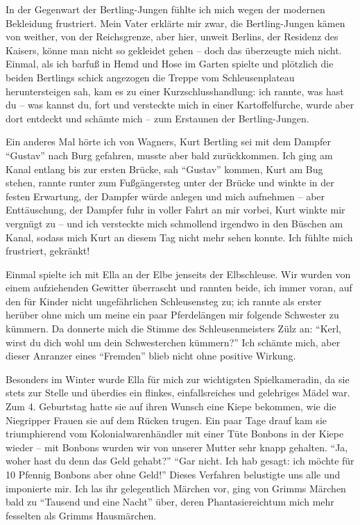 In der Gegenwart der Bertling-Jungen fühlte ich mich wegen der modernen Bekleidung frustriert. Mein Vater erklärte mir zwar, die Bertling-Jungen kämen von weither, von der Reichsgrenze, aber hier, unweit Berlins, der Residenz des Kaisers, könne man nicht so gekleidet gehen -- doch das überzeugte mich nicht. Einmal, als ich barfuß in Hemd und Hose im Garten spielte und plötzlich die beiden Bertlings schick angezogen die Treppe vom Schleusenplateau heruntersteigen sah, kam es zu einer Kurzschlusshandlung: ich rannte, was hast du -- was kannst du, fort und versteckte mich in einer Kartoffelfurche, wurde aber dort entdeckt und schämte mich -- zum Erstaunen der Bertling-Jungen.

Ein anderes Mal hörte ich von Wagners, Kurt Bertling sei mit dem Dampfer \enquote{Gustav} nach Burg gefahren, musste aber bald zurückkommen. Ich ging am Kanal entlang bis zur ersten Brücke, sah \enquote{Gustav} kommen, Kurt am Bug stehen, rannte runter zum Fußgängersteg unter der Brücke und winkte in der festen Erwartung, der Dampfer würde anlegen und mich aufnehmen -- aber Enttäuschung, der Dampfer fuhr in voller Fahrt an mir vorbei, Kurt winkte mir vergnügt zu -- und ich versteckte mich schmollend irgendwo in den Büschen am Kanal, sodass mich Kurt an diesem Tag nicht mehr sehen konnte. Ich fühlte mich frustriert, gekränkt!

Einmal spielte ich mit Ella an der Elbe jenseits der Elbschleuse. Wir wurden von einem aufziehenden Gewitter überrascht und rannten beide, ich immer voran, auf den für Kinder nicht ungefährlichen Schleusensteg zu; ich rannte als erster herüber ohne mich um meine ein paar Pferdelängen mir folgende Schwester zu kümmern. Da donnerte mich die Stimme des Schleusenmeisters Zülz an: \enquote{Kerl, wirst du dich wohl um dein Schwesterchen kümmern?} Ich schämte mich, aber dieser Anranzer eines \enquote{Fremden} blieb nicht ohne positive Wirkung.

Besonders im Winter wurde Ella für mich zur wichtigsten Spielkameradin, da sie stets zur Stelle und überdies ein flinkes, einfallsreiches und gelehriges Mädel war. Zum 4. Geburtstag hatte sie auf ihren Wunsch eine Kiepe bekommen, wie die Niegripper Frauen sie auf dem Rücken trugen. Ein paar Tage drauf kam sie triumphierend vom Kolonialwarenhändler mit einer Tüte Bonbons in der Kiepe wieder -- mit Bonbons wurden wir von unserer Mutter sehr knapp gehalten. \enquote{Ja, woher hast du denn das Geld gehabt?} \enquote{Gar nicht. Ich hab gesagt: ich möchte für 10 Pfennig Bonbons aber ohne Geld!} Dieses Verfahren belustigte uns alle und imponierte mir. Ich las ihr gelegentlich Märchen vor, ging von Grimms Märchen bald zu \enquote{Tausend und eine Nacht} über, deren Phantasiereichtum mich mehr fesselten als Grimms Hausmärchen.

